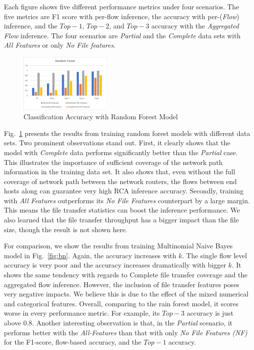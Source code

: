 Each figure shows five different performance metrics under four scenarios. The five metrics are F1 score with per-flow inference, the accuracy with per-({\it Flow}) inference, and the $Top-1$, $Top-2$, and $Top-3$ accuracy with
the {\it Aggregated Flow} inference. The four scenarios are {\it Partial} and the {\it Complete} data sets with {\it All Features} or only {\it No File features}.

\begin{figure}[!ht]
\begin{center}
\includegraphics[width=0.4\textwidth]{./figure/rf-accuracy}
\end{center}
\caption{Classification Accuracy with Random Forest Model}
\label{fig:dt}
\end{figure}

Fig.~\ref{fig:dt} presents the results from training random forest models with different data sets. Two prominent observations stand out. 
First, it clearly shows that the model with {\it Complete} data performs significantly better than the {\it Partial} case. This illustrates the importance of sufficient 
coverage of the network path information in the training data set. It also shows that, even without the full coverage of network path between the network routers, 
the flows between end hosts along can guarantee very high RCA inference accuracy.   
Secondly, training with {\it All Features} outperforms its {\it No File Features} counterpart by a large margin. This means the file transfer statistics can boost the inference performance.  
We also learned that the file transfer throughput has a bigger impact than the file size, though the result is not shown here. 

For comparison, we show the results from training Multinomial Naive Bayes model in Fig.~\ref{fig:bn}. Again, the accuracy increases with $k$. The single flow level accuracy is very poor 
and the accuracy increases dramatically with bigger $k$. It shows the same tendency with regards to Complete file transfer coverage and the aggregated flow inference. 
However, the inclusion of file transfer features poses very negative impacts. We believe this is due to the effect of the mixed numerical and categorical features. 
Overall, comparing to the rain forest model, it scores worse in every performance metric. For example, its $Top-3$ accuracy is just above $0.8$. 
Another interesting observation is that, in the {\it Partial} scenario, it performs better with the {\it All-Features} than that with only {\it No File Features (NF) } for the F1-score, flow-based accuracy, and the $Top-1$ accuracy.

